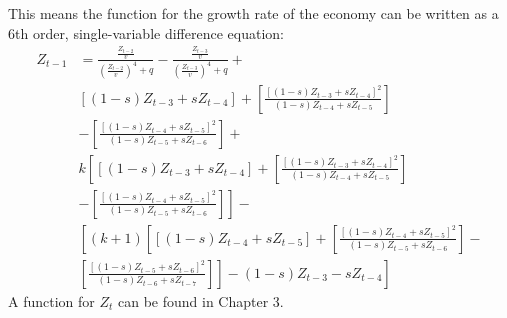 This means the function for the growth rate of the economy can be written as a 6th order, single-variable difference equation:
\begin{equation}
\begin{split}
    Z_{t-1}& = \frac{\frac{Z_{t-2}}{v}}{\left(\frac{Z_{t-2}}{v}\right)^4+q}-\frac{\frac{Z_{t-3}}{v}}{\left(\frac{Z_{t-3}}{v}\right)^4+q}+\\
    & [(1-s)Z_{t-3}+sZ_{t-4}]+\left[\frac{[(1-s)Z_{t-3}+sZ_{t-4}]^2}{(1-s)Z_{t-4}+sZ_{t-5}}\right]\\
    & -\left[\frac{[(1-s)Z_{t-4}+sZ_{t-5}]^2}{(1-s)Z_{t-5}+sZ_{t-6}}\right]+\\
    & k\left[[(1-s)Z_{t-3}+sZ_{t-4}]+\left[\frac{[(1-s)Z_{t-3}+sZ_{t-4}]^2}{(1-s)Z_{t-4}+sZ_{t-5}}\right]\right.\\
    & \left.-\left[\frac{[(1-s)Z_{t-4}+sZ_{t-5}]^2}{(1-s)Z_{t-5}+sZ_{t-6}}\right]\right]-\\
    & \left[(k+1)\left[[(1-s)Z_{t-4}+sZ_{t-5}]+\left[\frac{[(1-s)Z_{t-4}+sZ_{t-5}]^2}{(1-s)Z_{t-5}+sZ_{t-6}}\right]-\right.\right.\\
    & \left.\left.\left[\frac{[(1-s)Z_{t-5}+sZ_{t-6}]^2}{(1-s)Z_{t-6}+sZ_{t-7}}\right]\right]-(1-s)Z_{t-3}-sZ_{t-4}\right]
\end{split}
\end{equation}
A function for $Z_t$ can be found in Chapter 3.